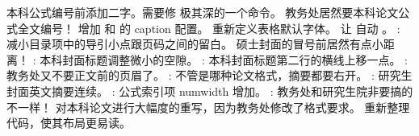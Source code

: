 \markdownRendererUlItem 本科公式编号前添加二字。需要修  极其深的一个命令。\markdownRendererUlItemEnd 
\markdownRendererUlItem 教务处居然要本科论文公式全文编号！\markdownRendererUlItemEnd 
\markdownRendererUlItem 增加  和  的 caption 配置。\markdownRendererUlItemEnd 
\markdownRendererUlItem 重新定义表格默认字体。\markdownRendererUlItemEnd 
\markdownRendererUlItem 让  自动 。\markdownRendererUlItemEnd 
\markdownRendererUlItem {}: 减小目录项中的导引小点跟页码之间的留白。\markdownRendererUlItemEnd 
\markdownRendererUlItem 硕士封面的冒号前居然有点小距离！\markdownRendererUlItemEnd 
\markdownRendererUlItem {}: 本科封面标题调整微小的空隙。\markdownRendererUlItemEnd 
\markdownRendererUlItem {}: 本科封面标题第二行的横线上移一点。\markdownRendererUlItemEnd 
\markdownRendererUlItem {}: 教务处又不要正文前的页眉了。\markdownRendererUlItemEnd 
\markdownRendererUlItem {}: 不管是哪种论文格式，摘要都要右开。\markdownRendererUlItemEnd 
\markdownRendererUlItem {}: 研究生封面英文摘要连续。\markdownRendererUlItemEnd 
\markdownRendererUlItem {}: 公式索引项 numwidth 增加。\markdownRendererUlItemEnd 
\markdownRendererUlItem {}: 教务处和研究生院非要搞的不一样！\markdownRendererUlItemEnd 
\markdownRendererUlEnd \markdownRendererInterblockSeparator
{}
\markdownRendererSectionEnd 
\markdownRendererSectionEnd \markdownRendererSectionBegin
{}\markdownRendererInterblockSeparator
{}\markdownRendererSectionBegin
{}\markdownRendererInterblockSeparator
{}\markdownRendererUlBegin
\markdownRendererUlItem 对本科论文进行大幅度的重写，因为教务处修改了格式要求。\markdownRendererUlItemEnd 
\markdownRendererUlItem 重新整理代码，使其布局更易读。\markdownRendererUlItemEnd 
